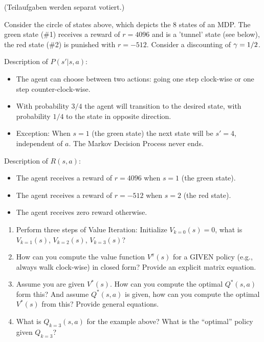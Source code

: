

\renewcommand{\course}{Artificial Intelligence}
\renewcommand{\coursepicture}{course_ai}
\renewcommand{\coursedate}{Winter 2019}
\renewcommand{\exnum}{3}

\exercises



(Teilaufgaben werden separat votiert.)


Consider the circle of states above, which depicts the 8 states of an
MDP. The green state (\#1) receives a reward of $r=4096$ and is a 'tunnel'
state (see below), the red state (\#2) is punished with
$r=-512$. Consider a discounting of $\gamma=1/2$.

Description of $P(s'|s,a)$:\NewParNoBreak
\begin{itemize}
\item The agent can choose between two actions: going one step clock-wise or one
  step counter-clock-wise.
\item With probability $3/4$ the agent will transition to the desired state,
  with probability $1/4$ to the state in opposite direction.
\item Exception: When $s=1$ (the green state) the next state will be
$s'=4$, independent of $a$. The Markov Decision Process never ends.
\end{itemize}

Description of $R(s,a)$:\NewParNoBreak
\begin{itemize}
\item The agent receives a reward of $r=4096$ when $s=1$ (the green state).
\item The agent receives a reward of $r=-512$ when $s=2$ (the red
state).
\item The agent receives zero reward otherwise.
\end{itemize}

\begin{enumerate}
\item Perform three steps of Value Iteration: Initialize $V_{k=0}(s)=0$, what is
  $V_{k=1}(s)$, $V_{k=2}(s)$, $V_{k=3}(s)$?
\item How can you compute the value function $V^\pi(s)$ for
a GIVEN policy (e.g., always walk clock-wise) in closed form? Provide
an explicit matrix equation.
\item Assume you are given $V^*(s)$. How can you compute the optimal $Q^*(s,a)$
  form this? And assume $Q^*(s,a)$ is given, how can you compute the optimal
  $V^*(s)$ from this? Provide general equations.
\item What is $Q_{k=3}(s,a)$ for the example above? What is the
  ``optimal'' policy given $Q_{k=3}$?
\end{enumerate}

